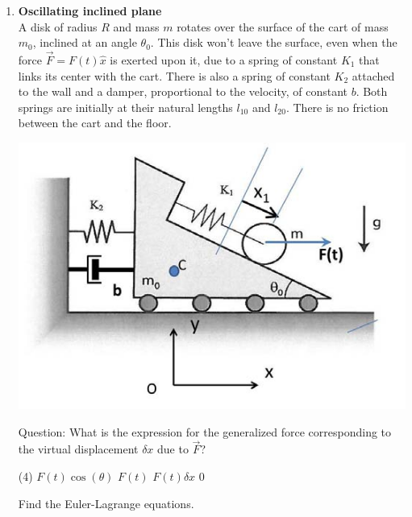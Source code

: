 \documentclass[11pt, a4paper, twoside]{article}
\begin{document}
\begin{enumerate}
\item
\begin{minipage}[t][6cm]{0.5\textwidth}
\textbf{Oscillating inclined plane}\\
A disk of radius $R$ and mass $m$ rotates over the surface of the cart of mass $m_0$, inclined at an angle $\theta_0$.
This disk won't leave the surface, even when the force $\vec{F}= F(t) \hat{x}$ is exerted upon it, due to a spring of constant $K_1$ that links its center with the cart.
There is also a spring of constant $K_2$ attached to the wall and a damper, proportional to the velocity, of constant $b$.
Both springs are initially at their natural lengths $l_{10}$ and $l_{20}$.
There is no friction between the cart and the floor.\\
\end{minipage}
\begin{minipage}[c][0cm][t]{0.45\textwidth}
	\includegraphics[width=\textwidth]{figures/pset7ex6}
\end{minipage}
Question: What is the expression for the generalized force corresponding to the virtual displacement $\delta x$ due to $\vec{F}$?\\
\begin{tasks}(4)
	\task $F(t) \cos(\theta)$
	\task $F(t)$
	\task $F(t) \delta x$
	\task $0$
\end{tasks}
Find the Euler-Lagrange equations. 



\end{enumerate}
\end{document}
